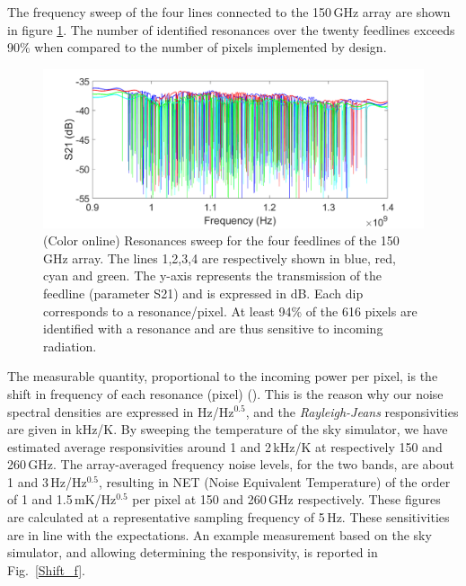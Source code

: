 \documentclass[]{aa} %
\begin{document}
The frequency sweep of the four lines connected to the 150\,GHz array are shown in figure \ref{VNA}. The number of identified resonances over the twenty feedlines exceeds 90\% when compared to the number of pixels implemented by design. 

\begin{figure}[h]
\begin{center}
   \centering
    \includegraphics[width=1.0\linewidth]{VNA_scans_150GHz.png}
    \caption{(Color online) Resonances sweep for the four feedlines of the 150\,GHz array. The lines 1,2,3,4 are respectively shown in blue, red, cyan and green. The y-axis represents the transmission of the feedline (parameter S21) and is expressed in dB. Each dip corresponds to a resonance/pixel. At least 94\% of the 616 pixels are identified with a resonance and are thus sensitive to incoming radiation.}
         \label{VNA}
\end{center}
\end{figure}

The measurable quantity, proportional to the incoming power per pixel, is the shift in frequency of each resonance (pixel) (\cite{Swenson2010}). This is the reason why our noise spectral densities are expressed in Hz/Hz$^{0.5}$, and the \textit{Rayleigh-Jeans} responsivities are given in kHz/K. By sweeping the temperature of the sky simulator, we have estimated average responsivities around 1 and 2\,kHz/K at respectively 150 and 260\,GHz. The array-averaged frequency noise levels, for the two bands, are about 1 and 3\,Hz/Hz$^{0.5}$, resulting in NET (Noise Equivalent Temperature) of the order of 1 and 1.5\,mK/Hz$^{0.5}$ per pixel at 150 and 260\,GHz respectively. These figures are calculated at a representative sampling frequency of 5\,Hz. 
These sensitivities are in line with the expectations. An example measurement based on the sky simulator, and allowing determining the responsivity, is reported in Fig.~\ref{Shift_f}. 
\end{document}
